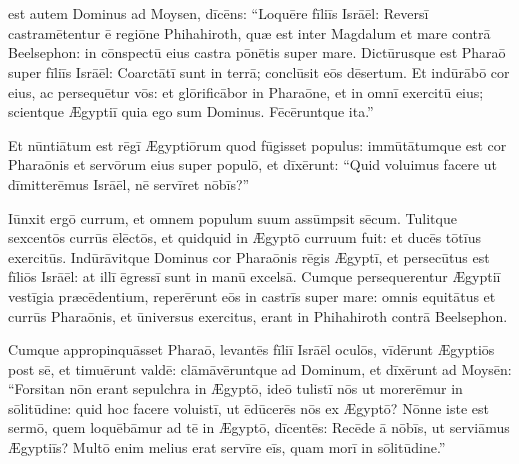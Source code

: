 \chapter{}


\thispagestyle{empty}

 est autem Dominus ad Moysen, dīcēns: ``Loquēre
fīliīs Isrāēl: Reversī castramētentur ē regiōne Phihahiroth, quæ est inter Magdalum et mare
contrā Beelsephon: in cōnspectū eius castra pōnētis super mare.
Dictūrusque est Pharaō super fīliīs Isrāēl:
Coarctātī sunt in terrā;
conclūsit eōs
dēsertum. Et indūrābō cor eius, ac
persequētur vōs: et glōrificābor in
Pharaōne, et in omnī exercitū eius; scientque Ægyptiī quia
ego sum Dominus. Fēcēruntque ita.''

Et nūntiātum est rēgī Ægyptiōrum quod
fūgisset populus: immūtātumque est cor
Pharaōnis et servōrum eius super populō, et dīxērunt: ``Quid
voluimus facere ut dīmitterēmus Isrāēl, nē servīret nōbīs?''

Iūnxit ergō
currum, et omnem populum suum assūmpsit sēcum. Tulitque sexcentōs currūs
ēlēctōs, et quidquid in Ægyptō curruum fuit: et ducēs tōtīus exercitūs.
Indūrāvitque Dominus cor Pharaōnis rēgis Ægyptī, et persecūtus est fīliōs
Isrāēl: at illī ēgressī sunt in manū excelsā.
Cumque persequerentur Ægyptiī vestīgia præcēdentium, reperērunt eōs in castrīs super mare: omnis equitātus et
currūs Pharaōnis, et ūniversus exercitus, erant in Phihahiroth contrā
Beelsephon. 

Cumque appropinquāsset Pharaō, levantēs fīliī Isrāēl oculōs,
vīdērunt Ægyptiōs post sē, et timuērunt valdē: clāmāvēruntque ad Dominum,
et dīxērunt ad Moysēn: ``Forsitan nōn erant sepulchra in
Ægyptō, ideō tulistī nōs ut morerēmur in sōlitūdine: quid hoc facere voluistī, ut ēdūcerēs
nōs ex Ægyptō? Nōnne iste est sermō, quem loquēbāmur ad tē in Ægyptō,
dīcentēs: Recēde ā nōbīs, ut serviāmus Ægyptiīs? Multō enim melius erat
servīre eīs, quam morī in sōlitūdine.''

